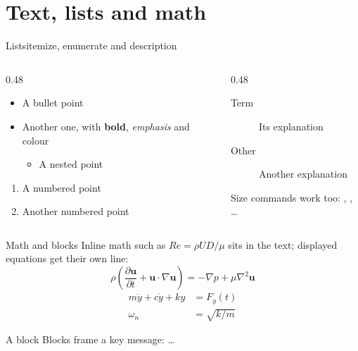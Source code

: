 \section{Text, lists and math}

\begin{frame}{Lists}{itemize, enumerate and description}
  \begin{columns}[T]
    \begin{column}{0.48\textwidth}
      \begin{itemize}
        \item A bullet point
        \item Another one, with \textbf{bold}, \emph{emphasis} and
              \textcolor{bannerblue}{colour}
          \begin{itemize}
            \item A nested point
          \end{itemize}
      \end{itemize}
      \begin{enumerate}
        \item A numbered point
        \item Another numbered point
      \end{enumerate}
    \end{column}
    \begin{column}{0.48\textwidth}
      \begin{description}
        \item[Term] Its explanation
        \item[Other] Another explanation
      \end{description}
      {\small Size commands work too: , , \ldots}
    \end{column}
  \end{columns}
\end{frame}

\begin{frame}{Math and blocks}
  Inline math such as \( Re = \rho U D / \mu \) sits in the text; displayed
  equations get their own line:
  \[ \rho \left( \frac{\partial \mathbf{u}}{\partial t}
       + \mathbf{u} \cdot \nabla \mathbf{u} \right)
     = -\nabla p + \mu \nabla^2 \mathbf{u} \]
  \begin{align}
    m \ddot{y} + c \dot{y} + k y &= F_y(t) \\
    \omega_n &= \sqrt{k / m}
  \end{align}
  \begin{block}{A block}
    Blocks frame a key message:  \ldots
  \end{block}
\end{frame}

